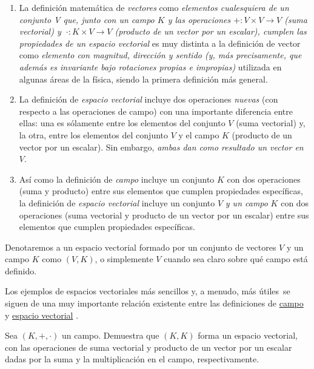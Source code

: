 \documentclass[notasLineal]{subfiles}
\begin{document}
\begin{Obs}\label{obs:1.5}\leavevmode
 \begin{enumerate}[label=(\arabic*)]

    \item La definición matemática de \emph{vectores} como \emph{elementos cualesquiera de un conjunto V que, junto con un campo $K$ y las operaciones $+:V\times V\to V$ (suma vectorial) y $\ \cdot:K\times V\to V$ (producto de un vector por un escalar), cumplen las propiedades de un espacio vectorial} es muy distinta a la definición de vector como \emph{elemento con magnitud, dirección y sentido (y, más precisamente, que además es invariante bajo rotaciones propias e impropias)} utilizada en algunas áreas de la física, siendo la primera definición más general.

    \item La definición de \emph{espacio vectorial} incluye dos operaciones \emph{nuevas} (con respecto a las operaciones de campo) con una importante diferencia entre ellas: una es sólamente entre los elementos del conjunto $V$ (suma vectorial) y, la otra, entre los elementos del conjunto $V$ y el campo $K$ (producto de un vector por un escalar). Sin embargo, \emph{ambas dan como resultado un vector en $V$}.

    \item Así como la definición de \emph{campo} incluye un conjunto $K$ con dos operaciones (suma y producto) entre sus elementos que cumplen propiedades específicas, la definición de \emph{espacio vectorial} incluye un conjunto $V$ \emph{y un campo} $K$ con dos operaciones (suma vectorial y producto de un vector por un escalar) entre sus elementos que cumplen propiedades específicas.
\end{enumerate}
\end{Obs}

\begin{Nota}\label{Nota: Espacio vectorial}
    Denotaremos a un espacio vectorial formado por un conjunto de vectores $V$ y un campo $K$ como $(V,K)$, o simplemente $V$ cuando sea claro sobre qué campo está definido. 
\end{Nota}

Los ejemplos de espacios vectoriales más sencillos \textemdash y, a menudo, más útiles\textemdash \ se siguen de una muy importante relación existente entre las definiciones de \href{Def: Campo}{campo} y \href{Def: Espacio vectorial}{espacio vectorial} .

\begin{Ejer}\label{ejer-4}
    Sea $(K,+,\cdot)$ un campo. Demuestra que $(K,K)$ forma un espacio vectorial, con las operaciones de suma vectorial y producto de un vector por un escalar dadas por la suma y la multiplicación en el campo, respectivamente.
\end{Ejer}
\end{document}
